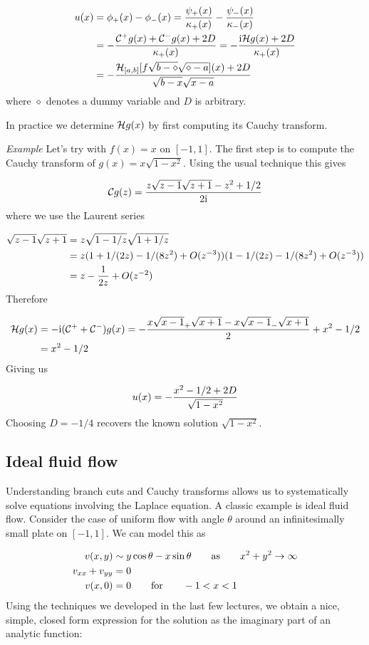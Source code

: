 \documentclass[12pt,a4paper]{article}
\def\qqfor{\qquad\hbox{for}\qquad}
\def\I{ {\rm i} }
\def\CC{ {\cal C} }
\def\HH{ {\cal H} }
\def\addtab#1={#1\;&=}
\def\ccr{\\\addtab}
\def\addtab#1={#1\;&=}
\def\ccr{\\\addtab}
\begin{document}
\begin{align*}
u(x) &= \phi_+(x) - \phi_-(x) = {\psi_+(x)\over \kappa_+(x)} - {\psi_-(x)\over \kappa_-(x)} \\
&= -{\CC^+ g(x) + \CC^- g(x) + 2 D \over \kappa_+(x)}
= -{\I \HH g(x) + 2D \over \kappa_+(x)}\\
& = -{\HH_{[a,b]}[f \sqrt{b-\diamond}\sqrt{\diamond-a}](x) + 2 D \over \sqrt{b-x} \sqrt{x-a}}
\end{align*}
where $\diamond$ denotes a dummy variable and $D$ is arbitrary.

In practice we determine $\HH g(x)$ by first computing its Cauchy transform.

\emph{Example} Let's try with $f(x) = x$ on $[-1,1]$. The first step is to compute the Cauchy transform of $g(x) = x \sqrt{1-x^2}$. Using the usual technique this gives

\[
\CC g(z) = {z \sqrt{z-1} \sqrt{z+1} - z^2 +1/2 \over 2 \I}
\]
where we use the Laurent series


\begin{align*}
\sqrt{z-1} \sqrt{z+1} &= z \sqrt{1-1/z} \sqrt{1 + 1/z} \ccr
= z (1+1/(2z) - 1/(8 z^2) + O(z^{-3}))(1-1/(2z)  - 1/(8 z^2) + O(z^{-3})) \ccr
= z -{1 \over 2 z} + O(z^{-2})
\end{align*}
Therefore


\begin{align*}
\HH g(x) &= -\I (\CC^+ + \CC^-) g(x) = - {x \sqrt{x-1}_+ \sqrt{x+1} - x \sqrt{x-1}_- \sqrt{x+1} \over 2} + x^2 - 1/2 \ccr
= x^2 - 1/2
\end{align*}
Giving us

\[
u(x) = -{x^2 - 1/2 + 2 D \over \sqrt{1-x^2}}
\]
Choosing $D = -1/4$ recovers the known solution $\sqrt{1-x^2}$.

\subsection{Ideal fluid flow}
Understanding branch cuts and Cauchy transforms allows us to systematically solve equations involving the Laplace equation. A classic example is ideal fluid flow. Consider the case of uniform flow with angle $\theta$ around an infinitesimally small plate on $[-1,1]$. We can model this as


\begin{align*}
v(x,y) &\sim y \cos \theta - x \sin \theta \qquad\hbox{as}\qquad x^2 + y^2 \to \infty  \\
v_{xx} + v_{yy} &= 0 \\
v(x,0) & = 0 \qqfor -1 < x <1
\end{align*}
Using the techniques we developed in the last few lectures, we obtain a nice, simple, closed form expression for the solution as the imaginary part of an analytic function:
\end{document}
